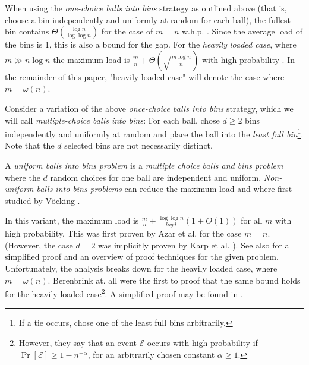 \documentclass{acm_proc_article-sp}
\begin{document}
When using the \emph{one-choice balls into bins} strategy as outlined above (that is, choose a bin independently and uniformly at random for each ball), the fullest bin contains $\Theta \left( \frac{\log n}{\log \log n} \right)$ for the case of $m = n$ w.h.p. \cite{RS98}. Since the average load of the bins is 1, this is also a bound for the gap. %
For the \emph{heavily loaded case}, where $m \gg n \log n$ the maximum load is $\frac{m}{n} + \Theta\left(\sqrt{\frac{m \log n}{n}}\right)$ with high probability \cite{RS98}. In the remainder of this paper, "heavily loaded case" will denote the case where $m = \omega\left(n\right)$.

Consider a variation of the above \emph{once-choice balls into bins} strategy, which we will call \emph{multiple-choice balls into bins}: For each ball, chose $d \geq 2$ bins independently and uniformly at random and place the ball into the \emph{least full bin}\footnote{If a tie occurs, chose one of the least full bins arbitrarily.}. Note that the $d$ selected bins are not necessarily distinct.

A \emph{uniform balls into bins problem} is a \emph{multiple choice balls and bins problem} where the $d$ random choices for one ball are independent and uniform. \emph{Non-uniform balls into bins problems} can reduce the maximum load and where first studied by Vöcking \cite{}.

In this variant, the maximum load is $\frac{m}{n} + \frac{\log \log n}{log d} \left( 1 + O\left(1\right)\right)$ for all $m$ with high probability. This was first proven by Azar et al. \cite{ABKU99} for the case $m = n$. (However, the case $d = 2$ was implicitly proven by Karp et al. \cite{KLM92}). See also \cite{RMS01} for a simplified proof and an overview of proof techniques for the given problem.  Unfortunately, the analysis breaks down for the heavily loaded case, where $m = \omega\left(n\right)$. Berenbrink at. all \cite{BFZR08} were the first to proof that the same bound holds for the heavily loaded case\footnote{However, they say that an event $\mathcal E$ occurs with high probability if $\Pr\left[\mathcal E \right]  \geq 1- n^{-\alpha}$, for an arbitrarily chosen constant $\alpha \geq 1$.}. A simplified proof may be found in \cite{TW13}. 
\end{document}
